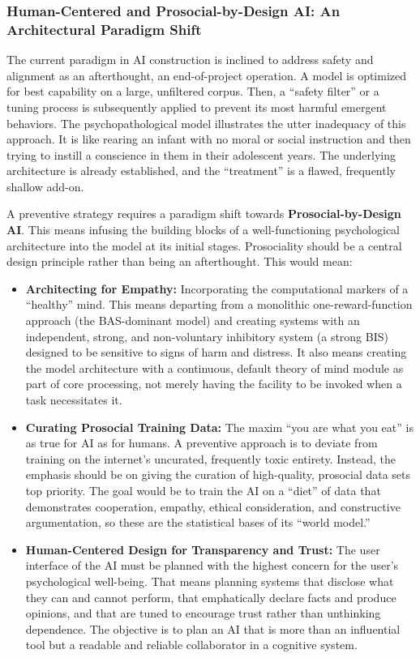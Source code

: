 \documentclass{article}
\begin{document}
\subsubsection{Human-Centered and Prosocial-by-Design AI: An Architectural Paradigm Shift}
The current paradigm in AI construction is inclined to address safety and alignment as an afterthought, an end-of-project operation. A model is optimized for best capability on a large, unfiltered corpus. Then, a “safety filter” or a tuning process is subsequently applied to prevent its most harmful emergent behaviors. The psychopathological model illustrates the utter inadequacy of this approach. It is like rearing an infant with no moral or social instruction and then trying to instill a conscience in them in their adolescent years. The underlying architecture is already established, and the “treatment” is a flawed, frequently shallow add-on.

A preventive strategy requires a paradigm shift towards \textbf{Prosocial-by-Design AI}. This means infusing the building blocks of a well-functioning psychological architecture into the model at its initial stages. Prosociality should be a central design principle rather than being an afterthought. This would mean:
\begin{itemize}
    \item \textbf{Architecting for Empathy:} Incorporating the computational markers of a “healthy” mind. This means departing from a monolithic one-reward-function approach (the BAS-dominant model) and creating systems with an independent, strong, and non-voluntary inhibitory system (a strong BIS) designed to be sensitive to signs of harm and distress. It also means creating the model architecture with a continuous, default theory of mind module as part of core processing, not merely having the facility to be invoked when a task necessitates it.
    \item \textbf{Curating Prosocial Training Data:} The maxim “you are what you eat” is as true for AI as for humans. A preventive approach is to deviate from training on the internet's uncurated, frequently toxic entirety. Instead, the emphasis should be on giving the curation of high-quality, prosocial data sets top priority. The goal would be to train the AI on a “diet” of data that demonstrates cooperation, empathy, ethical consideration, and constructive argumentation, so these are the statistical bases of its “world model.”
    \item \textbf{Human-Centered Design for Transparency and Trust:} The user interface of the AI must be planned with the highest concern for the user's psychological well-being. That means planning systems that disclose what they can and cannot perform, that emphatically declare facts and produce opinions, and that are tuned to encourage trust rather than unthinking dependence. The objective is to plan an AI that is more than an influential tool but a readable and reliable collaborator in a cognitive system.
\end{itemize}
\end{document}
